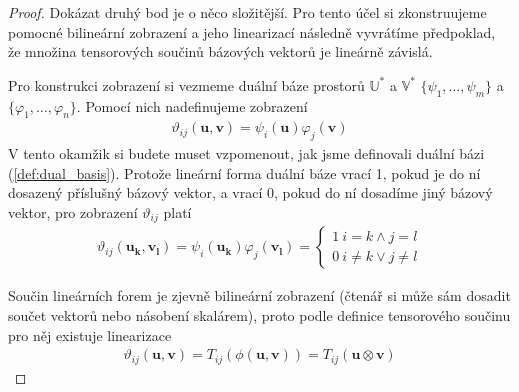 \documentclass[a5paper,12pt]{amsbook}
\theoremstyle{definition}
\newcommand{\myvec}[1]{\bm{#1}}
\newcommand{\myspace}[1]{\mathbb{#1}}
\begin{document}
\begin{proof}
\medskip\noindent
Dokázat druhý bod je o něco složitější. Pro tento účel si zkonstruujeme pomocné bilineární
zobrazení a jeho linearizací následně vyvrátíme předpoklad, že množina tensorových
součinů bázových vektorů je lineárně závislá.

Pro konstrukci zobrazení si vezmeme duální báze prostorů $\myspace{U^*}$ a $\myspace{V^*}$
$\{\psi_1, \dots, \psi_m\}$ a $\{\varphi_1, \dots, \varphi_n\}$. Pomocí nich nadefinujeme
zobrazení
\begin{equation*}
\begin{split}
\vartheta_{ij}(\myvec{u}, \myvec{v}) = \psi_i(\myvec{u})\varphi_j(\myvec{v})
\end{split}
\end{equation*}
V tento okamžik si budete muset vzpomenout, jak jsme definovali duální bázi (\ref{def:dual_basis}).
Protože lineární forma duální báze vrací 1, pokud je do ní dosazený příslušný bázový vektor, a
vrací 0, pokud do ní dosadíme jiný bázový vektor, pro zobrazení $\vartheta_{ij}$ platí
\begin{equation*}
\begin{split}
\vartheta_{ij}(\myvec{u_k}, \myvec{v_l}) = \psi_i(\myvec{u_k})\varphi_j(\myvec{v_l}) =
\begin{cases}
  1 \: i = k \wedge j = l \\
  0 \: i \neq k \vee j \neq l
\end{cases}
\end{split}
\end{equation*}

Součin lineárních forem je zjevně bilineární zobrazení (čtenář si může sám dosadit
součet vektorů nebo násobení skalárem), proto podle definice tensorového součinu pro něj existuje
linearizace
\begin{equation*}
\begin{split}
\vartheta_{ij}(\myvec{u}, \myvec{v}) = T_{ij}(\phi(\myvec{u}, \myvec{v})) = T_{ij}(\myvec{u}\otimes\myvec{v})
\end{split}
\end{equation*}


\end{proof}
\end{document}

